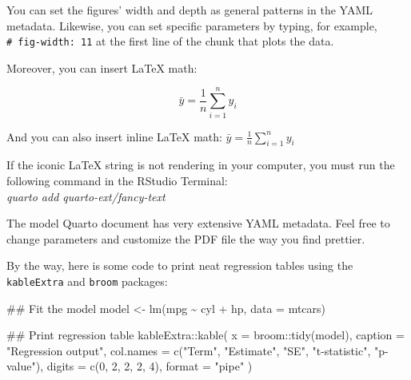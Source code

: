 \documentclass[
  12pt,
  letterpaper,
  DIV=11,
  numbers=noendperiod]{scrartcl}
\newenvironment{Shaded}{}{}
\newcommand{\AttributeTok}[1]{\textcolor[rgb]{0.65,0.15,0.64}{#1}}
\newcommand{\DecValTok}[1]{\textcolor[rgb]{0.60,0.41,0.00}{#1}}
\newcommand{\DocumentationTok}[1]{\textcolor[rgb]{0.89,0.34,0.29}{#1}}
\newcommand{\FunctionTok}[1]{\textcolor[rgb]{0.25,0.47,0.95}{#1}}
\newcommand{\NormalTok}[1]{\textcolor[rgb]{0.22,0.23,0.26}{#1}}
\newcommand{\OtherTok}[1]{\textcolor[rgb]{0.15,0.68,0.38}{#1}}
\newcommand{\SpecialCharTok}[1]{\textcolor[rgb]{0.00,0.52,0.74}{#1}}
\newcommand{\StringTok}[1]{\textcolor[rgb]{0.31,0.63,0.31}{#1}}
\begin{document}
You can set the figures' width and depth as general patterns in the YAML
metadata. Likewise, you can set specific parameters by typing, for
example, \texttt{\#\textbar{}\ fig-width:\ 11} at the first line of the
chunk that plots the data.

Moreover, you can insert {\LaTeX} math:

\[
\bar{y} = \frac{1}{n}\sum_{i=1}^n y_i
\]

And you can also insert inline {\LaTeX} math:
\(\bar{y} = \frac{1}{n}\sum_{i=1}^n y_i\)

\begin{tcolorbox}[enhanced jigsaw, colframe=quarto-callout-important-color-frame, leftrule=.75mm, title=\textcolor{quarto-callout-important-color}{\faExclamation}\hspace{0.5em}{Install extension}, coltitle=black, colback=white, bottomrule=.15mm, toprule=.15mm, opacityback=0, colbacktitle=quarto-callout-important-color!10!white, bottomtitle=1mm, arc=.35mm, breakable, toptitle=1mm, left=2mm, titlerule=0mm, opacitybacktitle=0.6, rightrule=.15mm]

If the iconic {\LaTeX} string is not rendering in your computer, you
must run the following command in the RStudio Terminal:\\

\emph{quarto add quarto-ext/fancy-text}

\end{tcolorbox}

The model Quarto document has very extensive YAML metadata. Feel free to
change parameters and customize the PDF file the way you find prettier.

By the way, here is some code to print neat regression tables using the
\texttt{kableExtra} and \texttt{broom} packages:

\begin{Shaded}
\begin{Highlighting}[]
\DocumentationTok{\#\# Fit the model}
\NormalTok{model }\OtherTok{\textless{}{-}} \FunctionTok{lm}\NormalTok{(mpg }\SpecialCharTok{\textasciitilde{}}\NormalTok{ cyl }\SpecialCharTok{+}\NormalTok{ hp, }\AttributeTok{data =}\NormalTok{ mtcars)}

\DocumentationTok{\#\# Print regression table}
\NormalTok{kableExtra}\SpecialCharTok{::}\FunctionTok{kable}\NormalTok{(}
  \AttributeTok{x =}\NormalTok{ broom}\SpecialCharTok{::}\FunctionTok{tidy}\NormalTok{(model), }
  \AttributeTok{caption =} \StringTok{"Regression output"}\NormalTok{,}
  \AttributeTok{col.names =} \FunctionTok{c}\NormalTok{(}\StringTok{"Term"}\NormalTok{, }\StringTok{"Estimate"}\NormalTok{, }\StringTok{"SE"}\NormalTok{, }\StringTok{"t{-}statistic"}\NormalTok{, }\StringTok{"p{-}value"}\NormalTok{),}
  \AttributeTok{digits =} \FunctionTok{c}\NormalTok{(}\DecValTok{0}\NormalTok{, }\DecValTok{2}\NormalTok{, }\DecValTok{2}\NormalTok{, }\DecValTok{2}\NormalTok{, }\DecValTok{4}\NormalTok{),}
  \AttributeTok{format =} \StringTok{"pipe"}
\NormalTok{)}
\end{Highlighting}
\end{Shaded}
\end{document}
